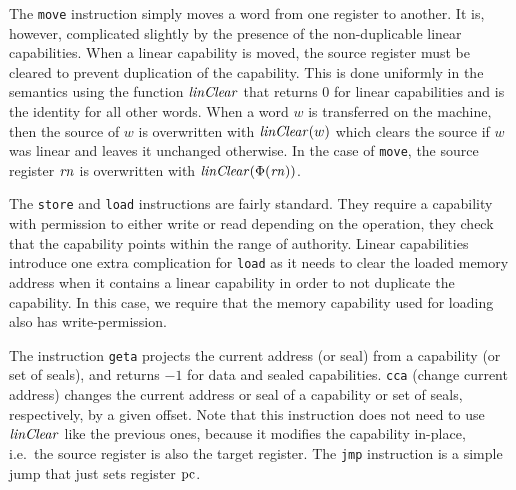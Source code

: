 \documentclass{jfp}
\renewcommand{\linCons}[1]{\plainfun{linClear}{#1}}
\begin{document}
The \texttt{move} instruction simply moves a word from one register to another.
It is, however, complicated slightly by the presence of the non-duplicable linear capabilities.
When a linear capability is moved, the source register must be cleared to prevent duplication of the capability.
This is done uniformly in the semantics using the function $\linCons{}$ that returns $0$ for linear capabilities and is the identity for all other words.
When a word $w$ is transferred on the machine, then the source of $w$ is overwritten with $\linCons{w}$ which clears the source if $w$ was linear and leaves it unchanged otherwise.
In the case of \texttt{move}, the source register $\mathit{rn}$ is overwritten with $\linCons{\Phi(\rn)}$.

The \texttt{store} and \texttt{load} instructions are fairly standard.
They require a capability with permission to either write or read depending on the operation, they check that the capability points within the range of authority.
Linear capabilities introduce one extra complication for \texttt{load} as it needs to clear the loaded memory address when it contains a linear capability in order to not duplicate the capability.
In this case, we require that the memory capability used for loading also has write-permission.

The instruction \texttt{geta} projects the current address (or seal) from a capability (or set of seals), and returns $-1$ for data and sealed capabilities.
\texttt{cca} (change current address) changes the current address or seal of a capability or set of seals, respectively, by a given offset.
Note that this instruction does not need to use $\linCons{}$ like the previous ones, because it modifies the capability in-place, i.e.\ the source register is also the target register.
The \texttt{jmp} instruction is a simple jump that just sets register $\mathrm{pc}$.
\end{document}
